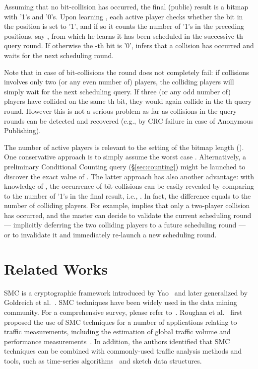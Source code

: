 \documentclass{sig-alternate}
\begin{document}
Assuming that no bit-collision has occurred, the final (public) result  is a bitmap with  '1's and  '0's. 
Upon learning , each active player  checks whether the bit in the  position is set to '1', and if so it counts the number of '1's in the preceding positions, say  , from which he learns it has been scheduled  
in the successive th query round. 
If otherwise the -th bit is  '0',  infers that a collision has occurred and waits for the next scheduling round.

Note that in case of bit-collisions the round does not completely fail: if collisions involves only two (or any even number of) players, the colliding players will simply wait for the next scheduling query. If three (or any odd number of) players have collided on the same th bit, they would again collide in the th query round. However this is not a serious problem as far as collisions in the query rounds can be detected and recovered (e.g., by CRC failure in case of Anonymous Publishing). 

The number of active players  is relevant to the setting of the bitmap length  (). One conservative approach is to simply assume the worst case . Alternatively, a preliminary Conditional Counting query (\S \ref{sec:counting}) might be launched to discover the exact value of .  The latter approach has also another advantage: with knowledge of , the occurrence of bit-collisions can be easily revealed by comparing to the number of '1's in the final result, i.e., . In fact, the difference  equals to the number of colliding players. For example,  implies that only a two-player collision has occurred, 
 and the master can decide to validate the current scheduling round --- implicitly deferring the two colliding players to a future scheduling round ---  or to invalidate it and immediately re-launch a new scheduling round.

\section{Related Works}

SMC is a cryptographic framework introduced by Yao~\cite{yao1982psc} and later
generalized by Goldreich et al.~\cite{Goldreich1987any}. 
SMC techniques have been widely used in the data mining community. For a comprehensive survey, please
refer to~\cite{Aggarwal2008survey}.
Roughan et al.~\cite{RoughanCCR} first proposed the use of SMC techniques for a number of applications
relating to traffic measurements, including the estimation of
global traffic volume and performance measurements~\cite{roughan2006ppp}.
In addition, the authors identified that SMC techniques can
be combined with commonly-used traffic analysis methods and tools, 
such as time-series algorithms~\cite{Atallah04} and sketch data structures. 
\end{document}
